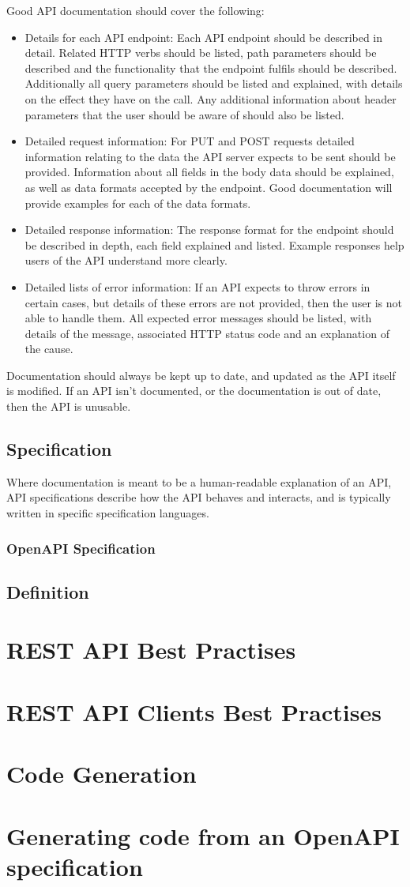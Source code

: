 Good API documentation should cover the following:
\begin{itemize}
    \item Details for each API endpoint: Each API endpoint should be described in detail. Related HTTP verbs should be listed, path parameters should be described and the functionality that the endpoint fulfils should be described. Additionally all query parameters should be listed and explained, with details on the effect they have on the call. Any additional information about header parameters that the user should be aware of should also be listed.
    \item Detailed request information: For PUT and POST requests detailed information relating to the data the API server expects to be sent should be provided. Information about all fields in the body data should be explained, as well as data formats accepted by the endpoint. Good documentation will provide examples for each of the data formats.
    \item Detailed response information: The response format for the endpoint should be described in depth, each field explained and listed. Example responses help users of the API understand more clearly. 
    \item Detailed lists of error information: If an API expects to throw errors in certain cases, but details of these errors are not provided, then the user is not able to handle them. All expected error messages should be listed, with details of the message, associated HTTP status code and an explanation of the cause. 
\end{itemize}
Documentation should always be kept up to date, and updated as the API itself is modified. If an API isn't documented, or the documentation is out of date, then the API is unusable.

\subsection{Specification}
Where documentation is meant to be a human-readable explanation of an API, API specifications describe how the API behaves and interacts, and is typically written in specific specification languages. 
\subsubsection{OpenAPI Specification}
\subsection{Definition}

\section{REST API Best Practises}
\section{REST API Clients Best Practises}
\section{Code Generation}
\section{Generating code from an OpenAPI specification}
